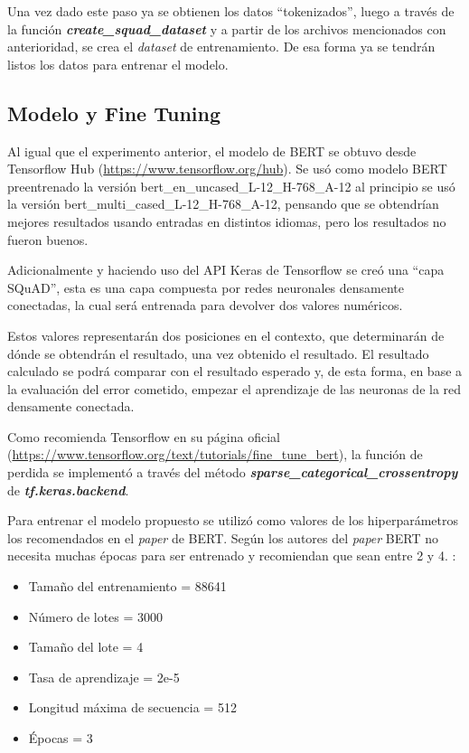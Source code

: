 Una vez dado este paso ya se obtienen los datos “tokenizados”, luego a través de la función \textbf{\textit{create\_squad\_dataset}} y a partir de los archivos mencionados con anterioridad, se crea el \textit{dataset} de entrenamiento. De esa forma ya se tendrán listos los datos para entrenar el modelo. 


\subsection{Modelo y Fine Tuning}
\label{subsection-qa-finetunning}

Al igual que el experimento anterior, el modelo de BERT se obtuvo desde Tensorflow Hub (\url{https://www.tensorflow.org/hub}). Se usó como modelo BERT preentrenado la versión bert\_en\_uncased\_L-12\_H-768\_A-12 al principio se usó la versión bert\_multi\_cased\_L-12\_H-768\_A-12, pensando que se obtendrían mejores resultados usando entradas en distintos idiomas, pero los resultados no fueron buenos. 

Adicionalmente y haciendo uso del API Keras de Tensorflow se creó una ``capa SQuAD'', esta es una capa compuesta por redes neuronales densamente conectadas, la cual será entrenada para devolver dos valores numéricos.

Estos valores representarán dos posiciones en el contexto, que determinarán de dónde se obtendrán el resultado, una vez obtenido el resultado. El resultado calculado se podrá comparar con el resultado esperado y, de esta forma, en base a la evaluación del error cometido, empezar el aprendizaje de las neuronas de la red densamente conectada. 

Como recomienda Tensorflow en su página oficial (\url{https://www.tensorflow.org/text/tutorials/fine_tune_bert}), la función de perdida se implementó a través del método \textbf{\textit{sparse\_categorical\_crossentropy}} de \textbf{\textit{tf.keras.backend}}.

Para entrenar el modelo propuesto se utilizó como valores de los hiperparámetros los recomendados en el \textit{paper} de BERT. Según los autores del \textit{paper} BERT no necesita muchas épocas para ser entrenado y recomiendan que sean entre 2 y 4. \cite{https://doi.org/10.48550/arxiv.1810.04805}:

\begin{itemize}
    \item Tamaño del entrenamiento = 88641 
    \item Número de lotes = 3000 
    \item Tamaño del lote = 4
    \item Tasa de aprendizaje = 2e-5
    \item Longitud máxima de secuencia = 512
    \item Épocas = 3
\end{itemize}


